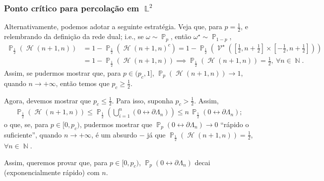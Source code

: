 \documentclass[9pt]{beamer}
\theoremstyle{definition} %
\DeclareMathOperator{\PX}{\mathbb{P}} %
\DeclareMathOperator{\NX}{\mathbb{N}} %
\DeclareMathOperator{\LX}{\mathbb{L}} %
\DeclareMathOperator{\HL}{\mathcal{H}} %
\DeclareMathOperator{\VL}{\mathcal{V}} %
\begin{document}
	\begin{frame}[t]
	\frametitle{Ponto crítico para percolação em $\LX^2$}
		Alternativamente, podemos adotar a seguinte estratégia. Veja que, para $p = \frac{1}{2}$, e relembrando da definição da rede dual; i.e., se $\omega \sim \PX_p$, então $\omega^{\star} \sim \PX_{1-p}$,
		\begin{align*}
			\PX_{\frac{1}{2}}(\HL(n + 1, n)) &= 1 - \PX_{\frac{1}{2}}(\HL(n + 1, n)^c) = 1 - \PX_{\frac{1}{2}}\left(\VL^{\star}\left(\left[\frac{1}{2}, n + \frac{1}{2}\right]\times\left[-\frac{1}{2}, n + \frac{1}{2}\right]\right)\right) \\
			&= 1 - \PX_{\frac{1}{2}}(\HL(n + 1, n)) \implies \PX_{\frac{1}{2}}(\HL(n + 1, n)) = \frac{1}{2}, ~\forall n \in \NX.
		\end{align*} \pause
		Assim, se pudermos mostrar que, para $p \in (p_c, 1]$, $\PX_p(\HL(n + 1, n)) \to 1$, quando $n \to +\infty$, então temos que $p_c \geq \frac{1}{2}$. \pause
		
		Agora, devemos mostrar que $p_c \leq \frac{1}{2}$. Para isso, suponha $p_c > \frac{1}{2}$. Assim,
		\begin{align*}
			\PX_{\frac{1}{2}}(\HL(n + 1, n)) \leq \PX_{\frac{1}{2}}\left(\bigcup_{i = 1}^{n} (0 \leftrightarrow \partial\Lambda_n)\right) \leq n \, \PX_{\frac{1}{2}}(0 \leftrightarrow \partial\Lambda_n);
		\end{align*}
		o que, se, para $p \in [0, p_c)$, pudermos mostrar que $\PX_p(0 \leftrightarrow \partial\Lambda_n) \to 0$ ``rápido o suficiente'', quando $n \to +\infty$, é um absurdo $-$ já que $\PX_{\frac{1}{2}}(\HL(n + 1, n)) = \frac{1}{2}$, $\forall n \in \NX$.
		
		Assim, queremos provar que, para $p \in [0, p_c)$, $\PX_p(0 \leftrightarrow \partial\Lambda_n)$ decai (exponencialmente rápido) com $n$.
	\end{frame}
\end{document}
